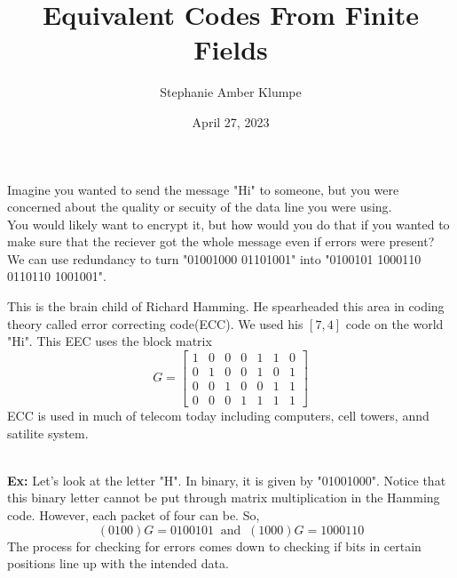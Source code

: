 \documentclass{beamer}
\title{Equivalent Codes From Finite Fields}
\author{Stephanie Amber Klumpe}
\institute{University of Colorado at Colorado Springs}
\date{April 27, 2023}
\begin{document}
\begin{frame}
    \titlepage
\end{frame}

\begin{frame}
    
    Imagine you wanted to send the message "Hi" to someone, but you were concerned about the quality
    or secuity of the data line you were using.\\
    You would likely want to encrypt it, but how would you do that if you wanted to make sure that the
    reciever got the whole message even if errors were present?\\
    We can use redundancy to turn "01001000 01101001" into "0100101 1000110 0110110 1001001".

\end{frame}

\begin{frame}
    
    This is the brain child of Richard Hamming. He spearheaded this area in coding theory called error
    correcting code(ECC). We used his $[7,4]$ code on the world "Hi". This EEC uses the block matrix
    $$G=\left[\begin{array}{ccccccc}
        1 & 0 & 0 & 0 & 1 & 1 & 0 \\
        0 & 1 & 0 & 0 & 1 & 0 & 1 \\
        0 & 0 & 1 & 0 & 0 & 1 & 1 \\
        0 & 0 & 0 & 1 & 1 & 1 & 1
    \end{array}\right]$$
    ECC is used in much of telecom today including computers, cell towers, annd satilite system.\\\

\end{frame}

\begin{frame}
    
    \textbf{Ex:} Let's look at the letter "H". In binary, it is given by "01001000". Notice that this
    binary letter cannot be put through matrix multiplication in the Hamming code. However, each packet
    of four can be. So,
    $$(0 1 0 0)G=0100101\;\;\text{and}\;\; (1 0 0 0)G=1000110$$
    The process for checking for errors comes down to checking if bits in certain positions line up with
    the intended data.

\end{frame}
\end{document}
